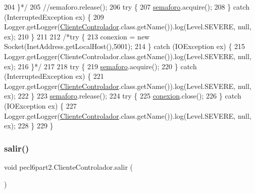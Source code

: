\begin{DoxyCode}
204 \textcolor{comment}{            \}*/}
205             \textcolor{comment}{//semaforo.release();}
206             \textcolor{keywordflow}{try} \{
207                 \mbox{\hyperlink{classpecl6part2_1_1_cliente_controlador_a200ce4defcaa86a68e9c8234f9e48a81}{semaforo}}.acquire();
208             \} \textcolor{keywordflow}{catch} (InterruptedException ex) \{
209                 Logger.getLogger(\mbox{\hyperlink{classpecl6part2_1_1_cliente_controlador_a6e526681bd2137858bfb2940eeb23cc8}{ClienteControlador}}.class.getName()).log(Level.SEVERE, 
      null, ex);
210             \}
211             
212             \textcolor{comment}{/*try \{}
213 \textcolor{comment}{                conexion = new Socket(InetAddress.getLocalHost(),5001);}
214 \textcolor{comment}{            \} catch (IOException ex) \{}
215 \textcolor{comment}{                Logger.getLogger(ClienteControlador.class.getName()).log(Level.SEVERE, null, ex);}
216 \textcolor{comment}{            \}*/}
217                 
218             \textcolor{keywordflow}{try} \{
219                 \mbox{\hyperlink{classpecl6part2_1_1_cliente_controlador_a200ce4defcaa86a68e9c8234f9e48a81}{semaforo}}.acquire();
220             \} \textcolor{keywordflow}{catch} (InterruptedException ex) \{
221                 Logger.getLogger(\mbox{\hyperlink{classpecl6part2_1_1_cliente_controlador_a6e526681bd2137858bfb2940eeb23cc8}{ClienteControlador}}.class.getName()).log(Level.SEVERE, 
      null, ex);
222             \}
223             \mbox{\hyperlink{classpecl6part2_1_1_cliente_controlador_a200ce4defcaa86a68e9c8234f9e48a81}{semaforo}}.release();
224             \textcolor{keywordflow}{try} \{
225                 \mbox{\hyperlink{classpecl6part2_1_1_cliente_controlador_a4882463501ccc3555c15225ea3076745}{conexion}}.close();
226             \} \textcolor{keywordflow}{catch} (IOException ex) \{
227                 Logger.getLogger(\mbox{\hyperlink{classpecl6part2_1_1_cliente_controlador_a6e526681bd2137858bfb2940eeb23cc8}{ClienteControlador}}.class.getName()).log(Level.SEVERE, 
      null, ex);
228             \}
229         \}
\end{DoxyCode}
\mbox{\label{classpecl6part2_1_1_cliente_controlador_a69a201c1f92fec9afb9f0729f784c489}} 
\subsubsection{\texorpdfstring{salir()}{salir()}}
{\footnotesize\ttfamily void pecl6part2.\+Cliente\+Controlador.\+salir (\begin{DoxyParamCaption}{ }\end{DoxyParamCaption})\hspace{0.3cm}{\ttfamily [inline]}}



